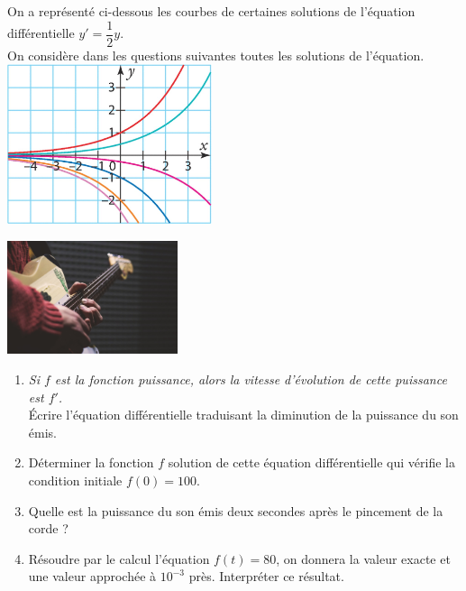 \documentclass[a4paper,11pt,exos]{nsi} %
\begin{document}
\exo{}
On a représenté ci-dessous les courbes de certaines solutions de l'équation différentielle $y'=\dfrac{1}{2}y$.\\
On considère dans les questions suivantes toutes les solutions de l'équation.\\[.5em]
{\includegraphics[width=6cm]{courbes2.jpg}}

\exo{}
{\includegraphics[width=5cm]{guitare.jpg}}
\begin{enumerate}
    \item \faInfo \hspace*{0.1cm} \textit{Si $f$ est la fonction puissance, alors la vitesse d'évolution de cette puissance est $f'$.}\\
    Écrire l'équation différentielle traduisant la diminution de la puissance du son émis.
    \item Déterminer la fonction $f$ solution de cette équation différentielle qui vérifie la condition initiale $f(0)=100$.
    \item Quelle est la puissance du son émis deux secondes après le pincement de la corde ?
    \item Résoudre par le calcul l'équation $f(t)=80$, on donnera la valeur exacte et une valeur approchée à $10^{-3}$ près. Interpréter ce résultat.
\end{enumerate}
\end{document}
